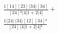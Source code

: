 \documentclass[varwidth, border=5pt]{standalone}
\begin{document}
\begin{my}
$\begin{gathered}
\scriptscriptstyle\frac{1[14][23]⟨34⟩[34]}{[24]²⟨4|1+2|4]} +\\
\scriptscriptstyle\frac{1⟨24⟩⟨34⟩[12][34]²}{[24]⟨4|1+2|4]²} \phantom{+}
\end{gathered}$
\end{my}
\end{document}
